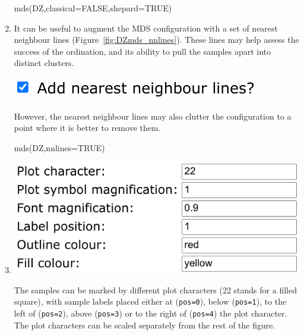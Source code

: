 \begin{refsection}
\begin{enumerate}
\begin{console}
mds(DZ,classical=FALSE,shepard=TRUE)
\end{console}

\item It can be useful to augment the MDS configuration with a set of
  nearest neighbour lines (Figure~\ref{fig:DZmds_nnlines}). These
  lines may help assess the success of the ordination, and its ability
  to pull the samples apart into distinct clusters.
  
\noindent\begin{minipage}[t]{.32\linewidth}
\strut\vspace*{-\baselineskip}\newline
\includegraphics[width=\linewidth]{../figures/detritalMDSnnlines.png}
\end{minipage}
\begin{minipage}[t]{.68\linewidth}
  However, the nearest neighbour lines may also clutter the
  configuration to a point where it is better to remove them.
\end{minipage}

\begin{console}
mds(DZ,nnlines=TRUE)
\end{console}

\item\noindent\begin{minipage}[t]{.47\linewidth}
\strut\vspace*{-\baselineskip}\newline
\includegraphics[width=\linewidth]{../figures/detritalMDSotheroptions.png}
\end{minipage}
\begin{minipage}[t]{.53\linewidth}
  The samples can be marked by different plot characters (22 stands
  for a filled square), with sample labels placed either at
  (\texttt{pos=0}), below (\texttt{pos=1}), to the left of
  (\texttt{pos=2}), above (\texttt{pos=3}) or to the right of
  (\texttt{pos=4}) the plot character. The plot characters can be
  scaled separately from the rest of the figure.
\end{minipage}


\end{enumerate}
\end{refsection}
